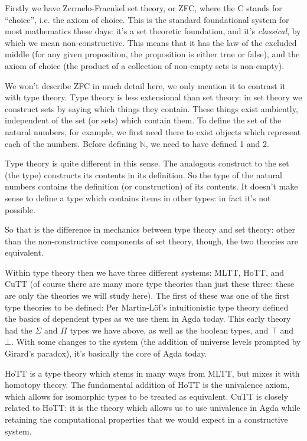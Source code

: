 Firstly we have Zermelo-Fraenkel set theory, or ZFC, where the C stands for
``choice'', i.e. the axiom of choice.
This is the standard foundational system for most mathematics these days: it's a
set theoretic foundation, and it's \emph{classical}, by which we mean
non-constructive.
This means that it has the law of the excluded middle (for any given
proposition, the proposition is either true or false), and the axiom of choice
(the product of a collection of non-empty sets is non-empty).

We won't describe ZFC in much detail here, we only mention it to contrast it
with type theory.
Type theory is less extensional than set theory: in set theory we construct sets
by saying which things they contain.
These things exist ambiently, independent of the set (or sets) which contain
them.
To define the set of the natural numbers, for example, we first need there to
exist objects which represent each of the numbers. 
Before defining \(\mathbb{N}\), we need to have defined 1 and 2.

Type theory is quite different in this sense.
The analogous construct to the set (the type) constructs its contents in its
definition.
So the type of the natural numbers contains the definition (or construction) of
its contents.
It doesn't make sense to define a type which contains items in other types: in
fact it's not possible.

So that is the difference in mechanics between type theory and set theory: other
than the non-constructive components of set theory, though, the two theories are
equivalent.

Within type theory then we have three different systems: MLTT, HoTT, and CuTT
(of course there are many more type theories than just these three: these are
only the theories we will study here).
The first of these was one of the first type theories to be defined: Per
Martin-Löf's intuitionistic type theory
\citep{martin-lofIntuitionisticTypeTheory1980} defined the basics of dependent
types as we use them in Agda today.
This early theory had the \(\Sigma\) and \(\Pi\) types we have above, as
well as the boolean types, and \(\top\) and \(\bot\).
With some changes to the system (the addition of universe levels prompted by
Girard's paradox), it's basically the core of Agda today.

HoTT \citep{hottbook} is a type theory which stems in many ways from MLTT, but
mixes it with homotopy theory.
The fundamental addition of HoTT is the univalence axiom, which allows for
isomorphic types to be treated as equivalent.
CuTT \citep{cohenCubicalTypeTheory2016} is closely related to HoTT: it is the
theory which allows us to use univalence in Agda while retaining the
computational properties that we would expect in a constructive system.
